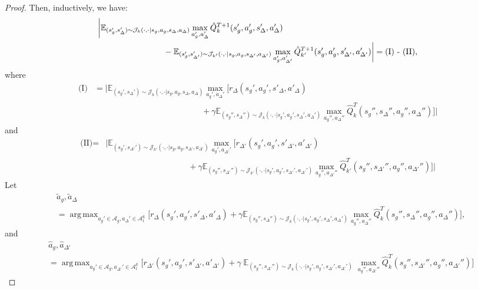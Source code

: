 \documentclass[10pt,a4paper]{amsart}
\DeclareMathOperator*{\argmax}{arg\,max}
\def\E{\mathbb{E}}
\begin{document}
\begin{proof}
Then, inductively, we have:
\begin{align*}
&\bigg|\E_{(s_g',s_\Delta')\sim{\mathcal{J}_k(\cdot,\cdot|s_g,a_g,s_\Delta,a_\Delta)}} \max_{a_g',a_\Delta'}\hat{Q}_k^{T+1}(s'_g,a_g',s_\Delta',a_\Delta') \\ 
&\quad\quad\quad \quad\quad \quad\quad \quad -\E_{(s_g',s_{\Delta'}')\sim{\mathcal{J}_{k'}(\cdot,\cdot|s_g,a_g,s_{\Delta'},a_{\Delta'})}}\max_{a_g',a'_{\Delta'}}\hat{Q}_{k'}^{T+1}(s'_g, a_g',s'_{\Delta'}, a'_{\Delta'})\bigg| = \text{(I) - \text{(II)}},
\end{align*}
where
\begin{align*}\text{(I)} &= \bigg|\E_{(s_g',s_\Delta')\sim{\mathcal{J}_k(\cdot,\cdot|s_g,a_g,s_\Delta,a_\Delta)}} \max_{a_g',a_\Delta'}\bigg[r_{\Delta}(s_g',a_g',s'_{\Delta}, a'_{\Delta})\\
&\quad\quad\quad\quad\quad \quad\quad\quad\quad\quad\quad\quad\quad+\gamma\E_{(s_g'',s_\Delta'')\sim\mathcal{J}_{k}(\cdot,\cdot|s_g',a_g',s_\Delta',a_\Delta')} \max_{a_g'',a_\Delta''}\hat{Q}_k^T(s_g'',s_\Delta'',a_g'',a_\Delta'')\bigg]\bigg|
\end{align*}
and
\begin{align*}
\text{(II)} = &\bigg|\E_{(s_g',s_{\Delta'}')\sim{\mathcal{J}_{k'}(\cdot,\cdot|s_g,a_g,s_{\Delta'},a_{\Delta'})}} \max_{a_g',a_{\Delta'}'}\bigg[r_{\Delta'}(s_g',a_g',s'_{\Delta'}, a'_{\Delta'})\\
&\quad\quad\quad\quad\quad\quad\quad\quad\quad\quad+\gamma\E_{(s_g'',s_{\Delta'}'')\sim\mathcal{J}_{k'}(\cdot,\cdot|s_g',a_g',s_{\Delta'}',a_{\Delta'}')} \max_{a_g'',a_{\Delta'}''}\hat{Q}_{k'}^T(s_g'',s_{\Delta'}'',a_g'',a_{\Delta'}'')\bigg]\bigg|
\end{align*}
Let
\begin{align*}&\tilde{a}_g,\tilde{a}_\Delta\\ &=\mathop{\argmax}_{a_g'\in\mathcal{A}_g, a_\Delta'\in\mathcal{A}_l^k} \bigg[r_{\Delta}(s_g',a_g',s'_{\Delta}, a'_{\Delta})+\gamma\E_{(s_g'',s_\Delta'')\sim\mathcal{J}_{k}(\cdot,\cdot|s_g',a_g',s_\Delta',a_\Delta')} \max_{a_g'',a_\Delta''}\hat{Q}_k^T(s_g'',s_\Delta'',a_g'',a_\Delta'')\bigg],\end{align*}
and
\begin{align*}&\hat{a}_g,\hat{a}_{\Delta'}\\
&=\mathop{\argmax}_{a_g'\in\mathcal{A}_g, a_{\Delta'}'\in\mathcal{A}_l^k} \bigg[r_{\Delta'}(s_g',a_g',s'_{\Delta'}, a'_{\Delta'})\!+\!\gamma\mathop{\E}_{(s_g'',s_{\Delta'}'')\sim\mathcal{J}_{k}(\cdot,\cdot|s_g',a_g',s_{\Delta'}',a_{\Delta'}')} \max_{a_g'',a_{\Delta'}''}\hat{Q}_k^T(s_g'',s_{\Delta'}'',a_g'',a_{\Delta'}'')\bigg]\end{align*}

\end{proof}
\end{document}
